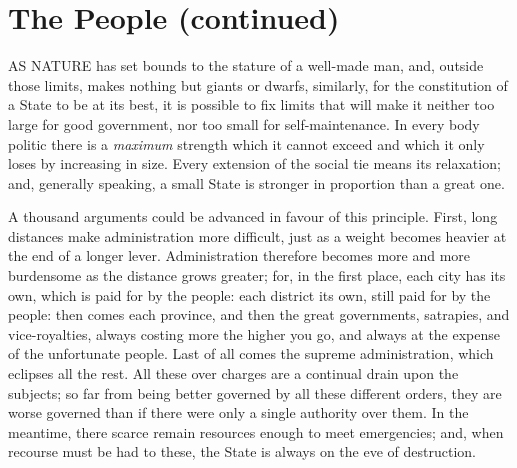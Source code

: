 \documentclass[12pt]{report}
\begin{document}
\section{The People (continued)}

AS NATURE has set bounds to the stature of a well-made man, and, outside those limits, makes nothing but giants or dwarfs, similarly, for the constitution of a State to be at its best, it is possible to fix limits that will make it neither too large for good government, nor too small for self-maintenance. In every body politic there is a \textit{maximum} strength which it cannot exceed and which it only loses by increasing in size. Every extension of the social tie means its relaxation; and, generally speaking, a small State is stronger in proportion than a great one.

A thousand arguments could be advanced in favour of this principle. First, long distances make administration more difficult, just as a weight becomes heavier at the end of a longer lever. Administration therefore becomes more and more burdensome as the distance grows greater; for, in the first place, each city has its own, which is paid for by the people: each district its own, still paid for by the people: then comes each province, and then the great governments, satrapies, and vice-royalties, always costing more the higher you go, and always at the expense of the unfortunate people. Last of all comes the supreme administration, which eclipses all the rest. All these over charges are a continual drain upon the subjects; so far from being better governed by all these different orders, they are worse governed than if there were only a single authority over them. In the meantime, there scarce remain resources enough to meet emergencies; and, when recourse must be had to these, the State is always on the eve of destruction.
\end{document}
